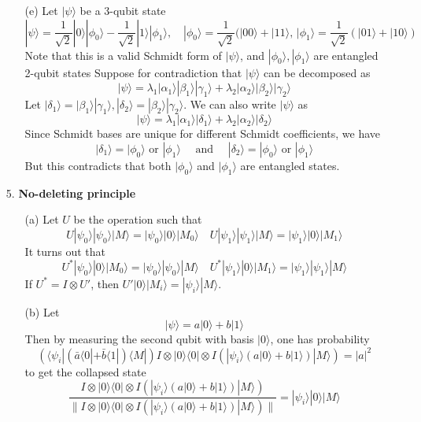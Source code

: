 \begin{enumerate}
\begin{enumerate}
    \item[(e)] Let $|\psi\rangle$ be a 3-qubit state
    \[
    |\psi\rangle = \frac{1}{\sqrt{2}}|0\rangle |\phi_0\rangle - \frac{1}{\sqrt{2}}|1\rangle |\phi_1\rangle,\quad |\phi_0\rangle = \frac{1}{\sqrt{2}}( |00\rangle + |11\rangle, \, |\phi_1\rangle = \frac{1}{\sqrt{2}}( |01\rangle + |10\rangle )
    \]
    Note that this is a valid Schmidt form of $|\psi\rangle$, and $|\phi_0\rangle, |\phi_1\rangle$ are entangled 2-qubit states Suppose for contradiction that $|\psi\rangle$ can be decomposed as
    \[
    |\psi\rangle = \lambda_1 |\alpha_1\rangle |\beta_1 \rangle |\gamma_1 \rangle + \lambda_2 |\alpha_2\rangle |\beta_2 \rangle |\gamma_2 \rangle
    \]
    Let $|\delta_1\rangle = |\beta_1 \rangle |\gamma_1 \rangle, |\delta_2\rangle = |\beta_2 \rangle |\gamma_2 \rangle$. We can also write $|\psi\rangle$ as
    \[
    |\psi \rangle = \lambda_1 |\alpha_1\rangle |\delta_1 \rangle + \lambda_2 |\alpha_2\rangle |\delta_2 \rangle
    \]
    Since Schmidt bases are unique for different Schmidt coefficients, we have
    \[
    |\delta_1\rangle = |\phi_0\rangle \text{ or } |\phi_1\rangle \quad \text{ and } \quad |\delta_2\rangle = |\phi_0\rangle \text{ or } |\phi_1\rangle
    \]
    But this contradicts that both $|\phi_0\rangle$ and $|\phi_1\rangle$ are entangled states.
    
    
\end{enumerate}

\item[5.] \textbf{No-deleting principle}

\begin{enumerate}
    \item [(a)] Let $U$ be the operation such that
    \[
    U |\psi_0\rangle |\psi_0\rangle |M\rangle = |\psi_0\rangle |0\rangle |M_0\rangle \quad     U |\psi_1\rangle |\psi_1\rangle |M\rangle = |\psi_1\rangle |0\rangle |M_1\rangle
    \]
    It turns out that
    \[
    U^* |\psi_0\rangle |0\rangle |M_0\rangle = |\psi_0\rangle |\psi_0\rangle |M\rangle  \quad  U^* |\psi_1\rangle |0\rangle |M_1\rangle = |\psi_1\rangle |\psi_1\rangle |M\rangle
    \]
    If $U^* = I \otimes U'$, then $U'|0\rangle |M_i\rangle = |\psi_i\rangle |M\rangle$.

    \item [(b)] Let
    \[
    |\psi\rangle = a|0\rangle + b|1\rangle
    \]
    Then by measuring the second qubit with basis $|0\rangle$, one has probability
    \[
    (\langle \psi_i | (\bar{a} \langle 0 | + \bar{b} \langle 1 |) \langle M | ) I \otimes |0\rangle \langle 0 | \otimes I (|\psi_i \rangle  (a | 0 \rangle + b | 1 \rangle) |M\rangle) = |a|^2
    \]
    to get the collapsed state
    \[
    \frac{I \otimes |0\rangle \langle 0 | \otimes I (|\psi_i \rangle  (a | 0 \rangle + b | 1 \rangle) |M\rangle)}{\| I \otimes |0\rangle \langle 0 | \otimes I (|\psi_i \rangle  (a | 0 \rangle + b | 1 \rangle) |M\rangle) \|} = |\psi_i \rangle |0\rangle |M\rangle
    \]


\end{enumerate}
\end{enumerate}
